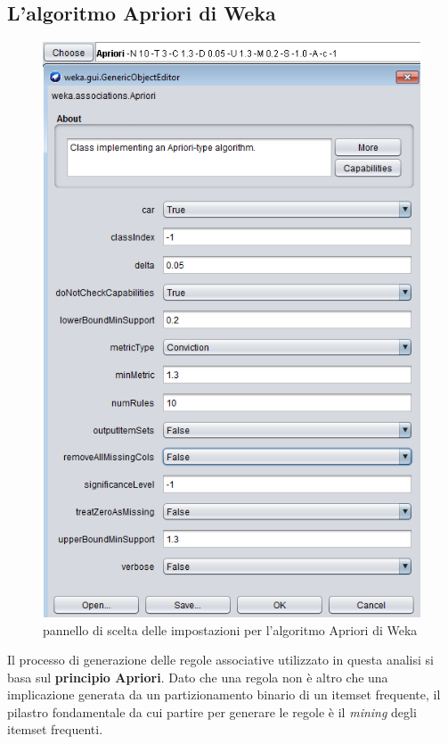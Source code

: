     \subsection{L'algoritmo Apriori di Weka}

    \begin{figure}
        \centering
        \caption{pannello di scelta delle impostazioni per l'algoritmo Apriori di Weka}
        \label{apriori_weka}
	    \includegraphics[scale=1.0]{img/apriori_weka.png}
    \end{figure}

        Il processo di generazione delle regole associative utilizzato in questa analisi si basa sul \textbf{principio Apriori}. Dato che una regola non è altro che una implicazione generata da un partizionamento binario di un itemset frequente, il pilastro fondamentale da cui partire per generare le regole è il \textit{mining} degli itemset frequenti. \\
        
